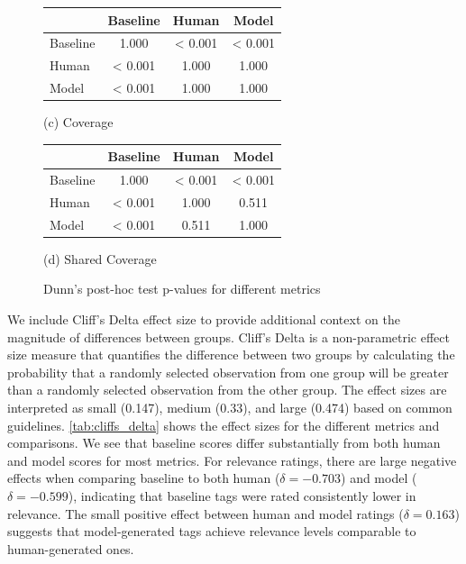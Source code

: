 \begin{figure}[h]
    \begin{minipage}{.5\textwidth}
        \centering
        \begin{tabular}{lccc}
            \hline
                     & \textbf{Baseline} & \textbf{Human} & \textbf{Model} \\
            \hline
            Baseline & 1.000             & < 0.001        & < 0.001        \\
            Human    & < 0.001           & 1.000          & 1.000          \\
            Model    & < 0.001           & 1.000          & 1.000          \\
            \hline
        \end{tabular}
        \caption*{(c) Coverage}
    \end{minipage}%
    \begin{minipage}{.5\textwidth}
        \centering
        \begin{tabular}{lccc}
            \hline
                     & \textbf{Baseline} & \textbf{Human} & \textbf{Model} \\
            \hline
            Baseline & 1.000             & < 0.001        & < 0.001        \\
            Human    & < 0.001           & 1.000          & 0.511          \\
            Model    & < 0.001           & 0.511          & 1.000          \\
            \hline
        \end{tabular}
        \caption*{(d) Shared Coverage}
    \end{minipage}
    \caption{Dunn's post-hoc test p-values for different metrics}
    \label{fig:dunns_test}
\end{figure}

We include Cliff's Delta effect size to provide additional context on the magnitude of differences between groups. Cliff's Delta is a non-parametric effect size measure that quantifies the difference between two groups by calculating the probability that a randomly selected observation from one group will be greater than a randomly selected observation from the other group. The effect sizes are interpreted as small (0.147), medium (0.33), and large (0.474) based on common guidelines. \cref{tab:cliffs_delta} shows the effect sizes for the different metrics and comparisons. We see that baseline scores differ substantially from both human and model scores for most metrics. For relevance ratings, there are large negative effects when comparing baseline to both human ($\delta = -0.703$) and model ($\delta = -0.599$), indicating that baseline tags were rated consistently lower in relevance. The small positive effect between human and model ratings ($\delta = 0.163$) suggests that model-generated tags achieve relevance levels comparable to human-generated ones.

